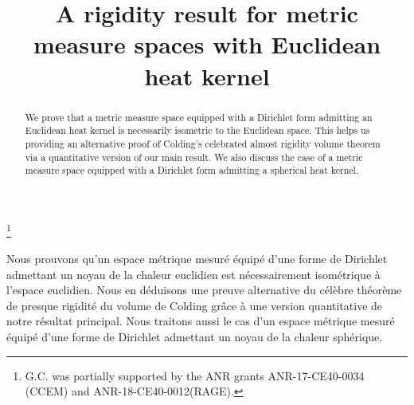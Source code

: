 \documentclass[JEP,XML,SOM,Unicode,published]{cedram}
\theoremstyle{plain}
\theoremstyle{definition}
\begin{document}
\title{A rigidity result for metric measure spaces with Euclidean heat kernel}

\author[\initial{G.} \lastname{Carron}]{ }
\address{Université de Nantes, Département de Mathématiques\\
2 rue de la Houssinière, BP 92208, 44322 Nantes cedex 03, France}

\thanks{G.C. was partially supported by the ANR grants ANR-17-CE40-0034 (CCEM) and ANR-18-CE40-0012(RAGE).}

\author[\initial{D.} \lastname{Tewodrose}]{ }
\address{CY Cergy Paris University, AGM\\
2 av. Adolphe Chauvin, 95302 Cergy-Pontoise cedex, France}

\begin{abstract}
We prove that a metric measure space equipped with a Dirichlet form admitting an Euclidean heat kernel is necessarily isometric to the Euclidean space. This helps us providing an alternative proof of Colding's celebrated almost rigidity volume theorem via a quantitative version of our main result. We also discuss the case of a metric measure space equipped with a Dirichlet form admitting a spherical heat kernel.
\end{abstract}





\begin{altabstract}
Nous prouvons qu'un espace métrique mesuré équipé d'une forme de Dirichlet admettant un noyau de la chaleur euclidien est nécessairement isométrique à l'espace euclidien. Nous en déduisons une preuve alternative du célèbre théorème de presque rigidité du volume de Colding grâce à une version quantitative de notre résultat principal. Nous traitons aussi le cas d'un espace métrique mesuré équipé d'une forme de Dirichlet admettant un noyau de la chaleur sphérique.
\end{altabstract}
\end{document}
